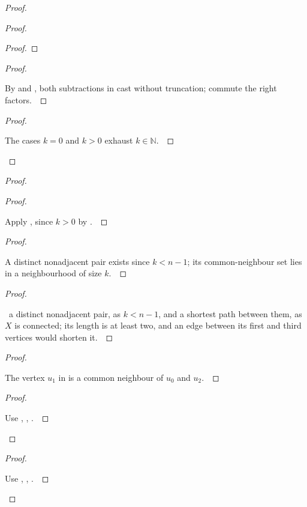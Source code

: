 \documentclass[11pt]{amsart}
\let\qed\relax
\newcommand\nn{{\mathbb N}}%
\theoremstyle{definition}
\begin{document}
\begin{proof}
\begin{proof}
\begin{proof}
\end{proof}
\begin{proof}
\pf\ \raggedright By  and , both subtractions in  cast without truncation; commute the right factors.~\qed
\end{proof}
\qedstep
\begin{proof}
\pf\ \raggedright The cases $k=0$ and $k>0$ exhaust $k\in\nn$.~\qed
\end{proof}
\end{proof}
\begin{proof}
\begin{proof}
\pf\ \raggedright Apply , since $k>0$ by .~\qed
\end{proof}
\begin{proof}
\pf\ \raggedright A distinct nonadjacent pair exists since $k<n-1$; its common-neighbour set lies in a neighbourhood of size $k$.~\qed
\end{proof}
\begin{proof}
\pf\ \raggedright \pick\ a distinct nonadjacent pair, as $k<n-1$, and a shortest path between them, as $X$ is connected; its length is at least two, and an edge between its first and third vertices would shorten it.~\qed
\end{proof}
\begin{proof}
\pf\ \raggedright The vertex $u_1$ in  is a common neighbour of $u_0$ and $u_2$.~\qed
\end{proof}
\qedstep
\begin{proof}
\pf\ \raggedright Use , , .~\qed
\end{proof}
\end{proof}
\qedstep
\begin{proof}
\pf\ \raggedright Use , , .~\qed
\end{proof}
\end{proof}
\end{document}
